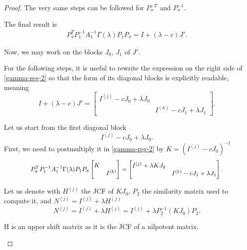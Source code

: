 \begin{proof}
    The very same steps can be followed for \(P_{\pi}^{-T}\) and \(P_{\pi}^{-1}\).

    The final result is
    \begin{gather}
        P_{\pi}^T P_{1}^{-1} A_{1}^{-1} \Gamma(\lambda) P_{1} P_{\pi} = I + (\lambda - c)J'. \label{gamma-reg-2}
    \end{gather}

    Now, we may work on the blocks \(J_{0}\), \(J_{1}\) of \(J'\).

    For the following steps, it is useful to rewrite the expression on the right side of \eqref{gamma-reg-2} so that
    the form of its diagonal blocks is explicitly readable, meaning
    \[
        I + (\lambda - c)J' =
        \begin{bmatrix}
            I^{(j)} - cJ_{0} + \lambda J_{0} & \\
            & I^{(k)} - cJ_{1} + \lambda J_{1}
        \end{bmatrix}.
    \]

    Let us start from the first diagonal block
    \[
        I^{(j)} - cJ_{0} + \lambda J_{0}.
    \]
    First, we need to postmultiply it in
    \eqref{gamma-reg-2} by \(K = (I^{(j)} - cJ_{0})^{-1}\)
    \begin{gather*}
        \scalemath{0.92}{
            P_{\pi}^T P_{1}^{-1} A_{1}^{-1} \Gamma(\lambda) P_{1} P_{\pi}
            \begin{bmatrix}
                K& \\
                & I^{(k)}
            \end{bmatrix}
            = 
            \begin{bmatrix}
                I^{(j)} + \lambda K J_{0} & \\
                & I^{(k)} - cJ_{1} + \lambda J_{1}
            \end{bmatrix}.
        }
    \end{gather*}

    Let us denote with \(H^{(j)}\) the JCF of \(K J_{0}\), \(P_{2}\) the similarity matrix
    used to compute it, and \(N^{(j)} = I^{(j)} + \lambda H^{(j)}\)
    \[
        N^{(j)} = I^{(j)} + \lambda H^{(j)} = I^{(j)} + \lambda P_{2}^{-1} (K J_{0}) P_{2}.
    \]

    \begin{remark}
        H is an upper shift matrix as it is the JCF of a nilpotent matrix.
    \end{remark}


\end{proof}
